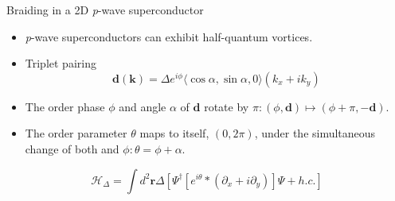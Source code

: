 \documentclass[xcolor=dvipsnames,10pt,aspectratio=169]{beamer}
\renewcommand{\vec}[1]{\mathbf{#1}}
\newcommand{\ham}{\mathcal{H}}
\begin{document}
  \begin{frame}{Braiding in a 2D \textit{p}-wave superconductor}
    \footnotesize
    \begin{multicols}{2}
      \begin{itemize}
        \item \textit{p}-wave superconductors can exhibit half-quantum vortices.
        \item Triplet pairing
          \begin{equation*}
            \vec{d}(\vec{k}) = \Delta e^{i\phi} \langle \cos \alpha, \sin \alpha, 0 \rangle(k_x + i k_y)
          \end{equation*}
        \item The order phase $\phi$ and angle $\alpha$ of $\vec{d}$ rotate by $\pi: (\phi,\vec{d}) \mapsto (\phi+\pi, -\vec{d})$.
        \item The order parameter $\theta$ maps to itself, $(0,2\pi)$, under the simultaneous change of both \vec{d} and $\phi: \theta = \phi+\alpha$.
      \end{itemize}
      \begin{equation*}
        \ham_{\Delta} = \int d^2\vec{r} \Delta \left[ \Psi^{\dagger} \left[ e^{i\theta} * (\partial_x + i\partial_y) \right] \Psi + h.c. \right]
      \end{equation*}


\end{multicols}
\end{frame}
\end{document}
